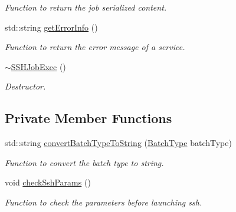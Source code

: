 \begin{DoxyCompactItemize}
\begin{DoxyCompactList}\small\item\em Function to return the job serialized content. \item\end{DoxyCompactList}\item 
std::string \hyperlink{classSSHJobExec_abf06bf930962ce64176116514620a20d}{getErrorInfo} ()
\begin{DoxyCompactList}\small\item\em Function to return the error message of a service. \item\end{DoxyCompactList}\item 
\hypertarget{classSSHJobExec_a99ad66768b94ddabf23ea33767d147da}{
\hyperlink{classSSHJobExec_a99ad66768b94ddabf23ea33767d147da}{$\sim$SSHJobExec} ()}
\label{classSSHJobExec_a99ad66768b94ddabf23ea33767d147da}

\begin{DoxyCompactList}\small\item\em Destructor. \item\end{DoxyCompactList}\end{DoxyCompactItemize}
\subsection*{Private Member Functions}
\begin{DoxyCompactItemize}
\item 
std::string \hyperlink{classSSHJobExec_a7299a222321c1ca1e32db976b1df79a2}{convertBatchTypeToString} (\hyperlink{utilVishnu_8hpp_a864d748e7097d176552dd4c7635016ea}{BatchType} batchType)
\begin{DoxyCompactList}\small\item\em Function to convert the batch type to string. \item\end{DoxyCompactList}\item 
void \hyperlink{classSSHJobExec_a259bd8021df6638c9dff43ebe416f25d}{checkSshParams} ()
\begin{DoxyCompactList}\small\item\em Function to check the parameters before launching ssh. \item\end{DoxyCompactList}\end{DoxyCompactItemize}
